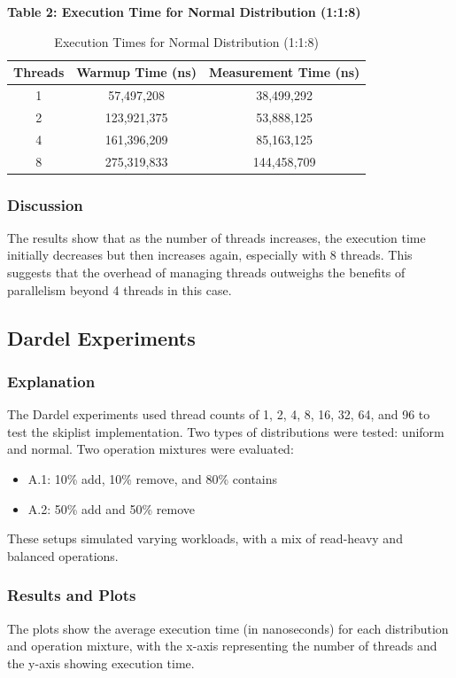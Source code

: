 \documentclass{article}
\begin{document}
\textbf{Table 2: Execution Time for Normal Distribution (1:1:8)}

\begin{table}[H]
    \centering
    \begin{tabular}{|c|c|c|}
    \hline
    \textbf{Threads} & \textbf{Warmup Time (ns)} & \textbf{Measurement Time (ns)} \\ \hline
    1 & 57,497,208 & 38,499,292 \\ 
    2 & 123,921,375 & 53,888,125 \\
    4 & 161,396,209 & 85,163,125 \\
    8 & 275,319,833 & 144,458,709 \\
    \hline
    \end{tabular}
    \caption{Execution Times for Normal Distribution (1:1:8)}
\end{table}

\subsubsection{Discussion}
The results show that as the number of threads increases, the execution time initially decreases but then increases again, especially with 8 threads. This suggests that the overhead of managing threads outweighs the benefits of parallelism beyond 4 threads in this case.


\newpage
\subsection{Dardel Experiments}

\subsubsection{Explanation}
The Dardel experiments used thread counts of 1, 2, 4, 8, 16, 32, 64, and 96 to test the skiplist implementation. Two types of distributions were tested: uniform and normal. Two operation mixtures were evaluated:
\begin{itemize}
    \item A.1: 10\% add, 10\% remove, and 80\% contains
    \item A.2: 50\% add and 50\% remove
\end{itemize}
These setups simulated varying workloads, with a mix of read-heavy and balanced operations.

\subsubsection{Results and Plots}
The plots show the average execution time (in nanoseconds) for each distribution and operation mixture, with the x-axis representing the number of threads and the y-axis showing execution time.
\end{document}
